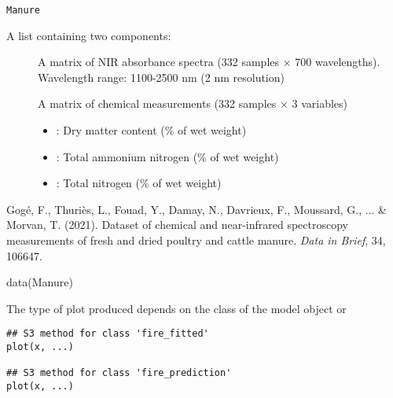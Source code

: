 \documentclass[a4paper]{book}
\begin{document}
%
\begin{Usage}
\begin{verbatim}
Manure
\end{verbatim}
\end{Usage}
%
\begin{Format}
A list containing two components:
\begin{description}

\item[] A matrix of NIR absorbance spectra (332 samples × 700 wavelengths). Wavelength range: 1100-2500 nm (2 nm resolution)
\item[] A matrix of chemical measurements (332 samples × 3 variables)
\begin{itemize}

\item{} : Dry matter content (\% of wet weight)
\item{} : Total ammonium nitrogen (\% of wet weight)
\item{} : Total nitrogen (\% of wet weight)

\end{itemize}


\end{description}

\end{Format}
%
\begin{References}
Gogé, F., Thuriès, L., Fouad, Y., Damay, N., Davrieux, F., Moussard, G., ... \& Morvan, T. (2021).
Dataset of chemical and near-infrared spectroscopy measurements of fresh and dried poultry and cattle manure.
\emph{Data in Brief}, 34, 106647. 
\end{References}
%
\begin{Examples}
\begin{ExampleCode}
data(Manure)
\end{ExampleCode}
\end{Examples}
%
\begin{Description}
The type of plot produced depends on
the class of the model object  or 
\end{Description}
%
\begin{Usage}
\begin{verbatim}
## S3 method for class 'fire_fitted'
plot(x, ...)

## S3 method for class 'fire_prediction'
plot(x, ...)
\end{verbatim}
\end{Usage}
\end{document}
